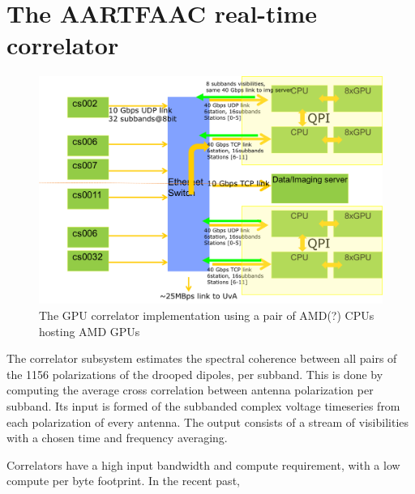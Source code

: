 \documentclass{aa}
\begin{document}
\section {\label{sec:gpucorr} The AARTFAAC real-time correlator}
\begin{figure}[htbp]
\centering
\includegraphics[width=1\textwidth]{Figs/correlator_arch.png}
\caption{The GPU correlator implementation using a pair of AMD(?) CPUs hosting AMD GPUs}
\label{fig:afaac_station_hw}
\end{figure}
The correlator subsystem  estimates the spectral coherence between  all pairs of
the 1156  polarizations of  the drooped  dipoles, per subband.  This is  done by
computing  the  average  cross  correlation  between  antenna  polarization  per
subband. Its  input is formed of  the subbanded complex voltage  timeseries from
each  polarization  of  every  antenna.  The output  consists  of  a  stream  of
visibilities with a chosen time and frequency averaging.

Correlators have a high input bandwidth and compute requirement, with a low compute per byte footprint. In the recent past, 
\end{document}
